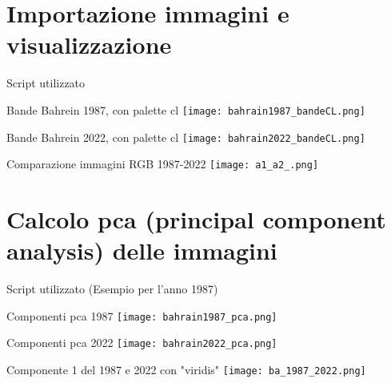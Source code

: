 \documentclass{beamer}
\begin{document}
\section{Importazione immagini e visualizzazione}

\begin{frame}{Script utilizzato}
\begin{tiny}

\end{tiny}
\end{frame}

\begin{frame}{Bande Bahrein 1987, con palette cl}
\texttt{[image: bahrain1987\_bandeCL.png]}
\centering
\end{frame}

\begin{frame}{Bande Bahrein 2022, con palette cl}
\texttt{[image: bahrain2022\_bandeCL.png]}
\centering
\end{frame}

\begin{frame}{Comparazione immagini RGB 1987-2022}
\texttt{[image: a1\_a2\_.png]}
\centering
\end{frame}

\section{Calcolo pca (principal component analysis) delle immagini}

\begin{frame}{Script utilizzato}
(Esempio per l'anno 1987)
\bigskip
\begin{tiny}

\end{tiny}
\end{frame}

\begin{frame}{Componenti pca 1987}
\texttt{[image: bahrain1987\_pca.png]}
\centering
\end{frame}

\begin{frame}{Componenti pca 2022}
\texttt{[image: bahrain2022\_pca.png]}
\centering
\end{frame}

\begin{frame}{Componente 1 del 1987 e 2022 con "viridis"}
\centering
\texttt{[image: ba\_1987\_2022.png]}
\end{frame}
\end{document}
